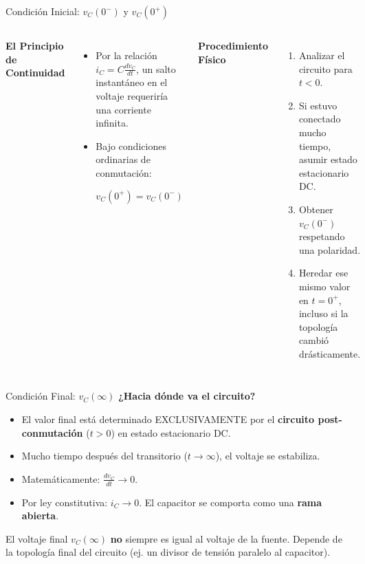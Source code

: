 \documentclass[aspectratio=169, 10pt]{beamer}
\begin{document}
\begin{frame}{Condición Inicial: $v_C(0^-)$ y $v_C(0^+)$}
    \begin{columns}[T]
        \textbf{El Principio de Continuidad}
        \begin{itemize}
            \item Por la relación $i_C = C \frac{dv_C}{dt}$, un salto instantáneo en el voltaje requeriría una corriente infinita.
            \item Bajo condiciones ordinarias de conmutación:
            \begin{alertblock}{}
                $$v_C(0^+) = v_C(0^-)$$
            \end{alertblock}
        \end{itemize}
        
        \textbf{Procedimiento Físico}
        \begin{enumerate}
            \item Analizar el circuito para $t < 0$.
            \item Si estuvo conectado mucho tiempo, asumir estado estacionario DC.
            \item Obtener $v_C(0^-)$ respetando una polaridad.
            \item Heredar ese mismo valor en $t=0^+$, incluso si la topología cambió drásticamente.
        \end{enumerate}
    \end{columns}
\end{frame}

\begin{frame}{Condición Final: $v_C(\infty)$}
    \textbf{¿Hacia dónde va el circuito?}
    \begin{itemize}
        \item El valor final está determinado EXCLUSIVAMENTE por el \textbf{circuito post-conmutación} ($t > 0$) en estado estacionario DC.
        \item Mucho tiempo después del transitorio ($t \to \infty$), el voltaje se estabiliza.
        \item Matemáticamente: $\frac{dv_C}{dt} \to 0$.
        \item Por ley constitutiva: $i_C \to 0$. El capacitor se comporta como una \textbf{rama abierta}.
    \end{itemize}
    \vspace{0.3cm}
    \begin{tcolorbox}[colback=gray!10, colframe=ucbblue, title=Precaución]
    El voltaje final $v_C(\infty)$ \textbf{no} siempre es igual al voltaje de la fuente. Depende de la topología final del circuito (ej. un divisor de tensión paralelo al capacitor).
    \end{tcolorbox}
\end{frame}
\end{document}
